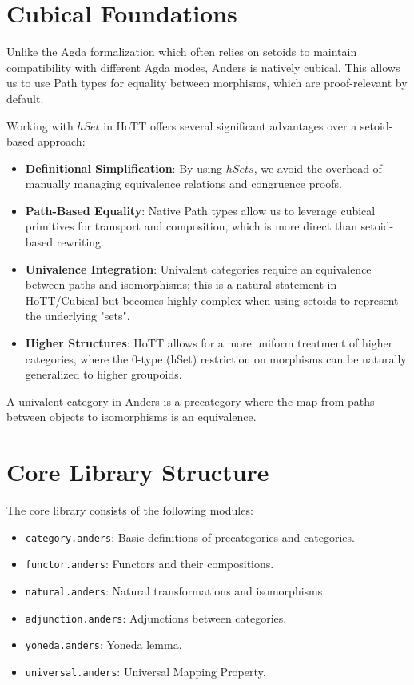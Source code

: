 \documentclass[11pt]{article}
\begin{document}
\newpage
\section{Cubical Foundations}

Unlike the Agda formalization which often relies on setoids to maintain compatibility with different Agda modes,
Anders is natively cubical. This allows us to use Path types for equality between morphisms, which are
proof-relevant by default.

Working with $hSet$ in HoTT offers several significant advantages over a setoid-based approach:
\begin{itemize}
    \item \textbf{Definitional Simplification}: By using $hSets$, we avoid the overhead of manually managing equivalence relations and congruence proofs.
    \item \textbf{Path-Based Equality}: Native Path types allow us to leverage cubical primitives for transport and composition, which is more direct than setoid-based rewriting.
    \item \textbf{Univalence Integration}: Univalent categories require an equivalence between paths and isomorphisms; this is a natural statement in HoTT/Cubical but becomes highly complex when using setoids to represent the underlying "sets".
    \item \textbf{Higher Structures}: HoTT allows for a more uniform treatment of higher categories, where the 0-type (hSet) restriction on morphisms can be naturally generalized to higher groupoids.
\end{itemize}

A univalent category in Anders is a precategory where the map from paths between
objects to isomorphisms is an equivalence.

\section{Core Library Structure}

The core library consists of the following modules:
\begin{itemize}
    \item \texttt{category.anders}: Basic definitions of precategories and categories.
    \item \texttt{functor.anders}: Functors and their compositions.
    \item \texttt{natural.anders}: Natural transformations and isomorphisms.
    \item \texttt{adjunction.anders}: Adjunctions between categories.
    \item \texttt{yoneda.anders}: Yoneda lemma.
    \item \texttt{universal.anders}: Universal Mapping Property.
\end{itemize}
\end{document}
